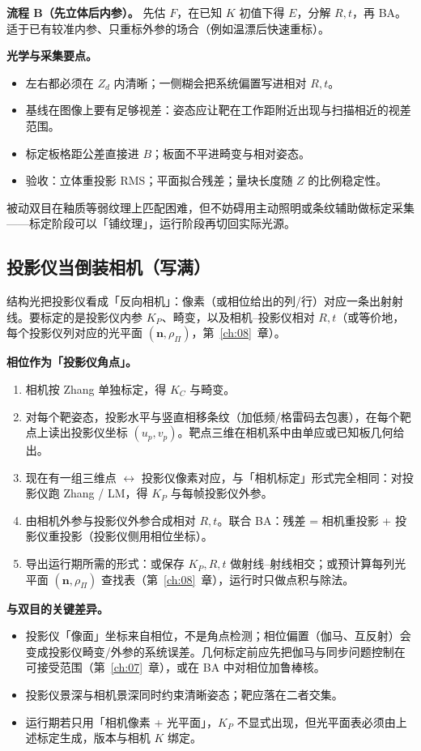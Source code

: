 \textbf{流程 B（先立体后内参）。} 先估 $F$，在已知 $K$ 初值下得 $E$，分解 $R,t$，再 BA。适于已有较准内参、只重标外参的场合（例如温漂后快速重标）。

\textbf{光学与采集要点。}
\begin{itemize}
  \item 左右都必须在 $Z_d$ 内清晰；一侧糊会把系统偏置写进相对 $R,t$。
  \item 基线在图像上要有足够视差：姿态应让靶在工作距附近出现与扫描相近的视差范围。
  \item 标定板格距公差直接进 $B$；板面不平进畸变与相对姿态。
  \item 验收：立体重投影 RMS；平面拟合残差；量块长度随 $Z$ 的比例稳定性。
\end{itemize}

被动双目在釉质等弱纹理上匹配困难，但不妨碍用主动照明或条纹辅助做标定采集——标定阶段可以「铺纹理」，运行阶段再切回实际光源。

\subsection{投影仪当倒装相机（写满）}

结构光把投影仪看成「反向相机」：像素（或相位给出的列/行）对应一条出射射线。要标定的是投影仪内参 $K_P$、畸变，以及相机–投影仪相对 $R,t$（或等价地，每个投影仪列对应的光平面 $(\boldsymbol n,\rho_\Pi)$，第~\ref{ch:08}~章）。

\textbf{相位作为「投影仪角点」。}
\begin{enumerate}
  \item 相机按 Zhang 单独标定，得 $K_C$ 与畸变。
  \item 对每个靶姿态，投影水平与竖直相移条纹（加低频/格雷码去包裹），在每个靶点上读出投影仪坐标 $(u_p,v_p)$。靶点三维在相机系中由单应或已知板几何给出。
  \item 现在有一组三维点 $\leftrightarrow$ 投影仪像素对应，与「相机标定」形式完全相同：对投影仪跑 Zhang / LM，得 $K_P$ 与每帧投影仪外参。
  \item 由相机外参与投影仪外参合成相对 $R,t$。联合 BA：残差 = 相机重投影 + 投影仪重投影（投影仪侧用相位坐标）。
  \item 导出运行期所需的形式：或保存 $K_P,R,t$ 做射线–射线相交；或预计算每列光平面 $(\boldsymbol n,\rho_\Pi)$ 查找表（第~\ref{ch:08}~章），运行时只做点积与除法。
\end{enumerate}

\textbf{与双目的关键差异。}
\begin{itemize}
  \item 投影仪「像面」坐标来自相位，不是角点检测；相位偏置（伽马、互反射）会变成投影仪畸变/外参的系统误差。几何标定前应先把伽马与同步问题控制在可接受范围（第~\ref{ch:07}~章），或在 BA 中对相位加鲁棒核。
  \item 投影仪景深与相机景深同时约束清晰姿态；靶应落在二者交集。
  \item 运行期若只用「相机像素 + 光平面」，$K_P$ 不显式出现，但光平面表必须由上述标定生成，版本与相机 $K$ 绑定。
\end{itemize}

